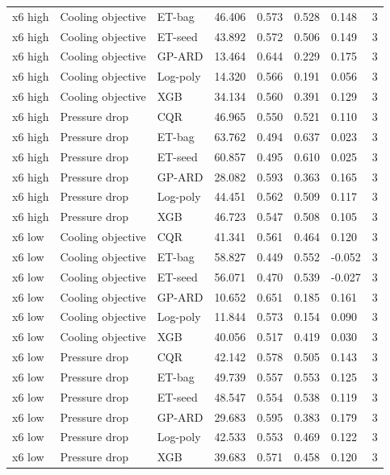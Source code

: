 \begin{longtable}{llllllll}
x6 high & Cooling objective & ET-bag & 46.406 & 0.573 & 0.528 & 0.148 & 3\\
x6 high & Cooling objective & ET-seed & 43.892 & 0.572 & 0.506 & 0.149 & 3\\
x6 high & Cooling objective & GP-ARD & 13.464 & 0.644 & 0.229 & 0.175 & 3\\
x6 high & Cooling objective & Log-poly & 14.320 & 0.566 & 0.191 & 0.056 & 3\\
x6 high & Cooling objective & XGB & 34.134 & 0.560 & 0.391 & 0.129 & 3\\
x6 high & Pressure drop & CQR & 46.965 & 0.550 & 0.521 & 0.110 & 3\\
x6 high & Pressure drop & ET-bag & 63.762 & 0.494 & 0.637 & 0.023 & 3\\
x6 high & Pressure drop & ET-seed & 60.857 & 0.495 & 0.610 & 0.025 & 3\\
x6 high & Pressure drop & GP-ARD & 28.082 & 0.593 & 0.363 & 0.165 & 3\\
x6 high & Pressure drop & Log-poly & 44.451 & 0.562 & 0.509 & 0.117 & 3\\
x6 high & Pressure drop & XGB & 46.723 & 0.547 & 0.508 & 0.105 & 3\\
x6 low & Cooling objective & CQR & 41.341 & 0.561 & 0.464 & 0.120 & 3\\
x6 low & Cooling objective & ET-bag & 58.827 & 0.449 & 0.552 & -0.052 & 3\\
x6 low & Cooling objective & ET-seed & 56.071 & 0.470 & 0.539 & -0.027 & 3\\
x6 low & Cooling objective & GP-ARD & 10.652 & 0.651 & 0.185 & 0.161 & 3\\
x6 low & Cooling objective & Log-poly & 11.844 & 0.573 & 0.154 & 0.090 & 3\\
x6 low & Cooling objective & XGB & 40.056 & 0.517 & 0.419 & 0.030 & 3\\
x6 low & Pressure drop & CQR & 42.142 & 0.578 & 0.505 & 0.143 & 3\\
x6 low & Pressure drop & ET-bag & 49.739 & 0.557 & 0.553 & 0.125 & 3\\
x6 low & Pressure drop & ET-seed & 48.547 & 0.554 & 0.538 & 0.119 & 3\\
x6 low & Pressure drop & GP-ARD & 29.683 & 0.595 & 0.383 & 0.179 & 3\\
x6 low & Pressure drop & Log-poly & 42.533 & 0.553 & 0.469 & 0.122 & 3\\
x6 low & Pressure drop & XGB & 39.683 & 0.571 & 0.458 & 0.120 & 3\\

\end{longtable}
